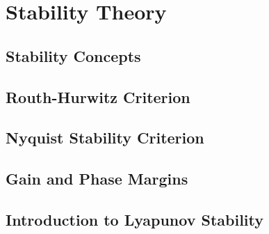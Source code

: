 \chapter{Stability Theory} \label{ch:stability}

    \section{Stability Concepts}

    \section{Routh-Hurwitz Criterion}

    \section{Nyquist Stability Criterion}

    \section{Gain and Phase Margins}

    \section{Introduction to Lyapunov Stability}